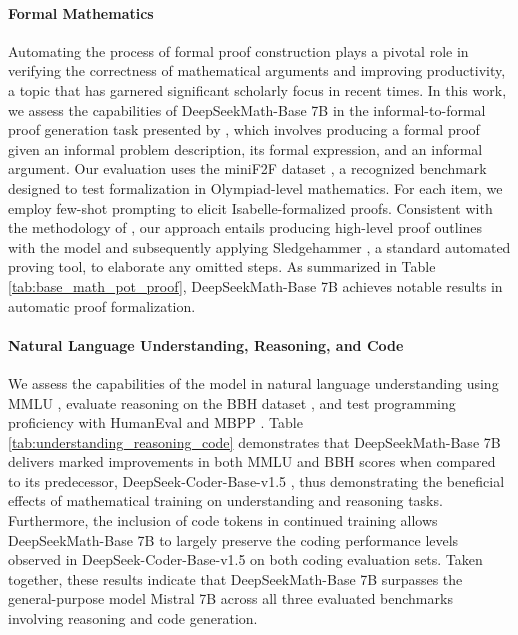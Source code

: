 \begin{itemize}[topsep=0pt]
\paragraph{Formal Mathematics}

Automating the process of formal proof construction plays a pivotal role in verifying the correctness of mathematical arguments and improving productivity, a topic that has garnered significant scholarly focus in recent times. In this work, we assess the capabilities of DeepSeekMath-Base 7B in the informal-to-formal proof generation task presented by \citep{dsp_proof}, which involves producing a formal proof given an informal problem description, its formal expression, and an informal argument. Our evaluation uses the miniF2F dataset \citep{minif2f}, a recognized benchmark designed to test formalization in Olympiad-level mathematics. For each item, we employ few-shot prompting to elicit Isabelle-formalized proofs. Consistent with the methodology of \cite{dsp_proof}, our approach entails producing high-level proof outlines with the model and subsequently applying Sledgehammer \citep{sledgehammer}, a standard automated proving tool, to elaborate any omitted steps. As summarized in Table \ref{tab:base_math_pot_proof}, DeepSeekMath-Base 7B achieves notable results in automatic proof formalization.

\paragraph{Natural Language Understanding, Reasoning, and Code}

We assess the capabilities of the model in natural language understanding using MMLU \citep{mmlu}, evaluate reasoning on the BBH dataset \citep{bbh}, and test programming proficiency with HumanEval \citep{codex} and MBPP \citep{mbpp}. Table \ref{tab:understanding_reasoning_code} demonstrates that DeepSeekMath-Base 7B delivers marked improvements in both MMLU and BBH scores when compared to its predecessor, DeepSeek-Coder-Base-v1.5 \citep{deepseek-coder}, thus demonstrating the beneficial effects of mathematical training on understanding and reasoning tasks. Furthermore, the inclusion of code tokens in continued training allows DeepSeekMath-Base 7B to largely preserve the coding performance levels observed in DeepSeek-Coder-Base-v1.5 on both coding evaluation sets. Taken together, these results indicate that DeepSeekMath-Base 7B surpasses the general-purpose model Mistral 7B \citep{mistral} across all three evaluated benchmarks involving reasoning and code generation.


\end{itemize}
